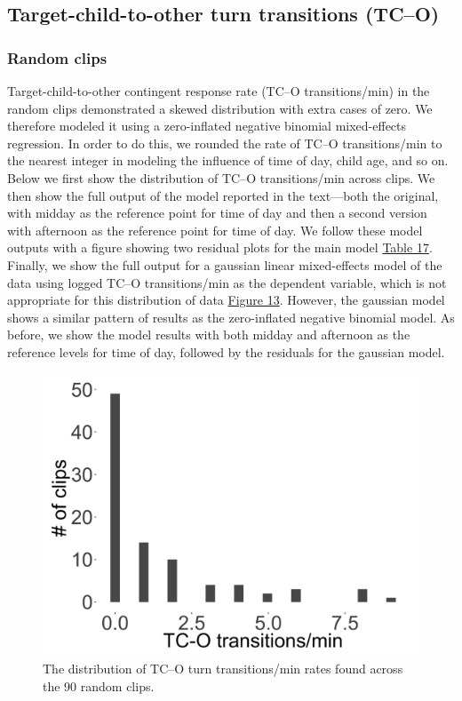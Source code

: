 \documentclass[floatsintext,man]{apa6}
\theoremstyle{definition}
\theoremstyle{definition}
\theoremstyle{definition}
\theoremstyle{remark}
\begin{document}
\newpage

\subsection{Target-child-to-other turn transitions
(TC--O)}\label{models-tc_o}

\subsubsection{Random clips}\label{models-tc_o-random}

Target-child-to-other contingent response rate (TC--O transitions/min)
in the random clips demonstrated a skewed distribution with extra cases
of zero. We therefore modeled it using a zero-inflated negative binomial
mixed-effects regression. In order to do this, we rounded the rate of
TC--O transitions/min to the nearest integer in modeling the influence
of time of day, child age, and so on. Below we first show the
distribution of TC--O transitions/min across clips. We then show the
full output of the model reported in the text---both the original, with
midday as the reference point for time of day and then a second version
with afternoon as the reference point for time of day. We follow these
model outputs with a figure showing two residual plots for the main
model \protect\hyperlink{tab17}{Table 17}. Finally, we show the full
output for a gaussian linear mixed-effects model of the data using
logged TC--O transitions/min as the dependent variable, which is not
appropriate for this distribution of data
\protect\hyperlink{fig13}{Figure 13}. However, the gaussian model shows
a similar pattern of results as the zero-inflated negative binomial
model. As before, we show the model results with both midday and
afternoon as the reference levels for time of day, followed by the
residuals for the gaussian model.

\begin{figure}

{\centering \includegraphics[width=0.4\linewidth]{www/c_o_tpm_random_distribution} 

}

\caption{The distribution of TC--O turn transitions/min rates found across the 90 random clips.}\label{fig:fig13}
\end{figure}
\end{document}

